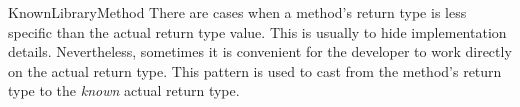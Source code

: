 \begin{pattern}{KnownLibraryMethod}
There are cases when a method's return type is less specific than the
actual return type value.
This is usually to hide implementation details.
Nevertheless, sometimes it is convenient for the developer to work
directly on the actual return type.
This pattern is used to cast from the method's return type to
the \emph{known} actual return type.

\instances
        
\end{pattern}
